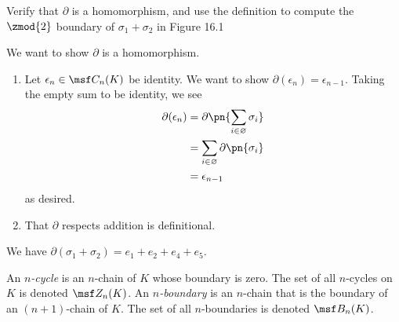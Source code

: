 \begin{problem}[16.2]
  Verify that $\partial$ is a homomorphism, and use the definition to compute
  the $\zmod{2}$ boundary of $\sigma_1 + \sigma_2$ in Figure 16.1
\end{problem}
\begin{solution}
  We want to show $\partial$ is a homomorphism.
  \begin{enumerate}
  \item Let $\epsilon_n \in \msf C_n(K)$ be identity. We want to show
    $\partial(\epsilon_n) = \epsilon_{n-1}$. Taking the empty sum to be
    identity, we see
    \begin{align*}
      \partial(\epsilon_n)
      &=
        \partial\pn{\sum_{i\in \varnothing} \sigma_i} \\
      &= \sum_{i\in\varnothing} \partial\pn{\sigma_i} \\
      &= \epsilon_{n-1}
    \end{align*}
    as desired.
  \item That $\partial$ respects addition is definitional.
  \end{enumerate}
  We have $\partial(\sigma_1 + \sigma_2) = e_1 + e_2 + e_4 + e_5$.
\end{solution}
\begin{definition}
  An \emph{$n$-cycle} is an $n$-chain of $K$ whose boundary is zero. The set of
  all $n$-cycles on $K$ is denoted $\msf Z_n(K)$. An \emph{$n$-boundary} is an
  $n$-chain that is the boundary of an $(n+1)$-chain of $K$. The set of all
  $n$-boundaries is denoted $\msf B_n(K)$.
\end{definition}

